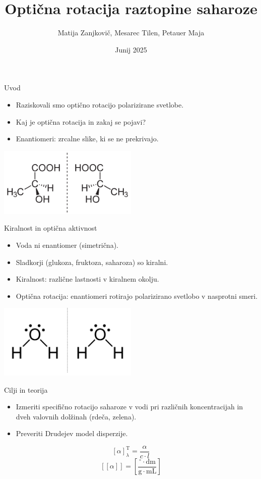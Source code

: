\documentclass[slovene]{beamer}
\title{Optična rotacija raztopine saharoze}
\author{Matija Zanjkovič, Mesarec Tilen, Petauer Maja}
\date{Junij 2025}
\begin{document}
\begin{frame}
    \titlepage
\end{frame}

\begin{frame}{Uvod}
    \begin{itemize}
        \item Raziskovali smo optično rotacijo polarizirane svetlobe.
        \item Kaj je optična rotacija in zakaj se pojavi?
        \item Enantiomeri: zrcalne slike, ki se ne prekrivajo.
    \end{itemize}
    \begin{center}
        \includegraphics[width=0.5\textwidth]{slike/enantiomer.png}
    \end{center}
\end{frame}

\begin{frame}{Kiralnost in optična aktivnost}
    \begin{itemize}
        \item Voda ni enantiomer (simetrična).
        \item Sladkorji (glukoza, fruktoza, saharoza) so kiralni.
        \item Kiralnost: različne lastnosti v kiralnem okolju.
        \item Optična rotacija: enantiomeri rotirajo polarizirano svetlobo v nasprotni smeri.
    \end{itemize}
    \begin{center}
        \includegraphics[width=0.5\textwidth]{slike/voda.png}
    \end{center}
\end{frame}

\begin{frame}{Cilji in teorija}
    \begin{itemize}
        \item Izmeriti specifično rotacijo saharoze v vodi pri različnih koncentracijah in dveh valovnih dolžinah (rdeča, zelena).
        \item Preveriti Drudejev model disperzije.
    \end{itemize}
    \[
        [\alpha]^{\text{T}}_{\lambda}= \frac{\alpha}{c \cdot l}
    \]
    \[
        \left[ [\alpha] \right] = \left[ \frac{^\circ \cdot \mathrm{dm}}{\mathrm{g} \cdot \mathrm{mL}} \right]
    \]
\end{frame}
\end{document}
